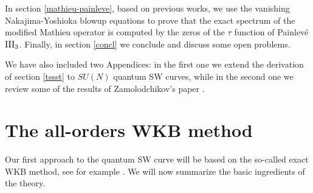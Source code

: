 \documentclass[a4paper,11pt]{article}
\theoremstyle{definition}
\begin{document}
 In section \ref{mathieu-painleve}, based on previous
works, we use the vanishing Nakajima-Yoshioka blowup equations to
prove that the exact spectrum of the modified Mathieu operator is computed by the
zeros of the $\tau$ function of Painlev\' e $\rm III_3$.  Finally, in
section \ref{concl} we conclude and discuss some open problems.


We have also included two Appendices: in the first one we extend the
derivation of section \ref{tssst} to $SU(N)$ quantum SW curves, while
in the second one we review some of the results of Zamolodchikov's
paper \cite{post-zamo}.

\section{The all-orders WKB method}\label{wkb}


Our first approach to the quantum SW curve will be based on the
so-called exact WKB method, see for example
\cite{voros,voros-quartic,ddpham,in-exactwkb}.  We will now summarize
the basic ingredients of the theory.
\end{document}
